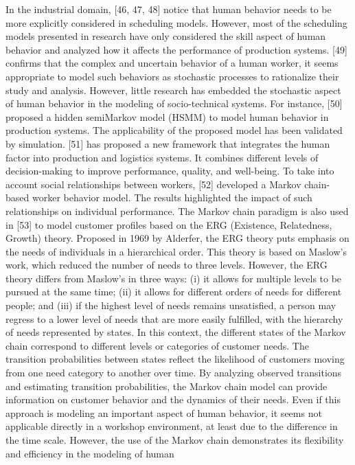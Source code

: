 In the industrial domain, [46, 47, 48] notice that human behavior needs to be more explicitly considered in scheduling models. However, most of the scheduling models presented in research have only considered the skill aspect of human behavior and analyzed how it affects the performance of production systems. [49] confirms that the complex and uncertain behavior of a human worker, it seems appropriate to model such behaviors as stochastic processes to rationalize their study and analysis. However, little research has embedded the stochastic aspect of human behavior in the modeling of socio-technical systems. For instance, [50] proposed a hidden semiMarkov model (HSMM) to model human behavior in production systems. The applicability of the proposed model has been validated by simulation. [51] has proposed a new framework that integrates the human factor into production and logistics systems. It combines different levels of decision-making to improve performance, quality, and well-being. To take into account social relationships between workers, [52] developed a Markov chain-based worker behavior model. The results highlighted the impact of such relationships on individual performance.
The Markov chain paradigm is also used in [53] to model customer profiles based on the ERG
(Existence, Relatedness, Growth) theory. Proposed in 1969 by Alderfer, the ERG theory puts emphasis on the needs of individuals in a hierarchical order. This theory is based on Maslow’s work, which reduced the number of needs to three levels. However, the ERG theory differs from Maslow’s in three ways: (i) it allows for multiple levels to be pursued at the same time; (ii) it allows for different orders of needs for different people; and (iii) if the highest level of needs remains unsatisfied, a person may regress to a lower level of needs that are more easily fulfilled, with the hierarchy of needs represented by states. In this context, the different states of the Markov chain correspond to different levels or categories of customer needs. The transition probabilities between states reflect the likelihood of customers moving from one need category to another over time. By analyzing observed transitions and estimating transition probabilities, the Markov chain model can provide information on customer behavior and the dynamics of their needs. Even if this approach is modeling an important aspect of human behavior, it seems not applicable directly in a workshop environment, at least due to the difference in the time scale. However, the use of the Markov chain demonstrates its flexibility and efficiency in the modeling of human
